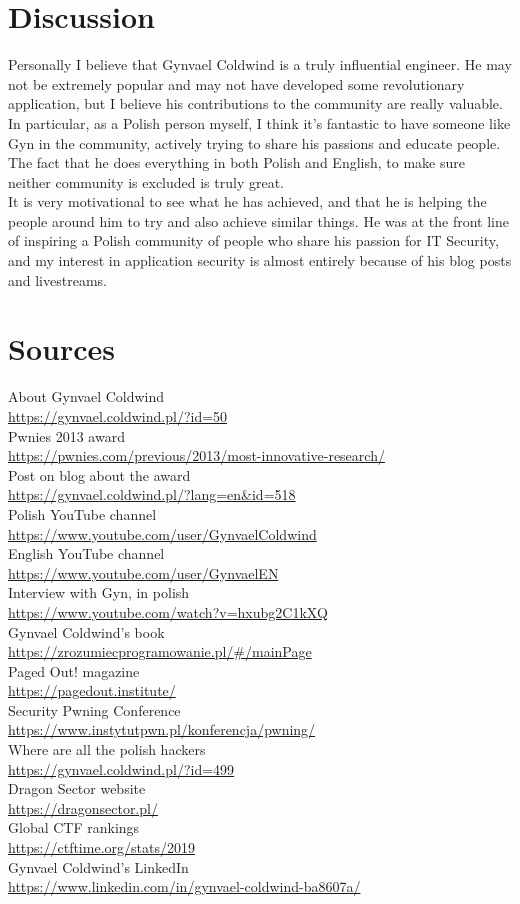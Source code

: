 \documentclass[11pt]{article}
\begin{document}
\section{Discussion}
Personally I believe that Gynvael Coldwind is a truly influential engineer. He may not be extremely popular and may not have developed some revolutionary application, but I believe his contributions to the community are really valuable. In particular, as a Polish person myself, I think it's fantastic to have someone like Gyn in the community, actively trying to share his passions and educate people. The fact that he does everything in both Polish and English, to make sure neither community is excluded is truly great.\\

It is very motivational to see what he has achieved, and that he is helping the people around him to try and also achieve similar things. He was at the front line of inspiring a Polish community of people who share his passion for IT Security, and my interest in application security is almost entirely because of his blog posts and livestreams.


\section{Sources}
About Gynvael Coldwind\\
\url{https://gynvael.coldwind.pl/?id=50}\\
Pwnies 2013 award\\
\url{https://pwnies.com/previous/2013/most-innovative-research/}\\
Post on blog about the award\\
\url{https://gynvael.coldwind.pl/?lang=en&id=518}\\
Polish YouTube channel\\
\url{https://www.youtube.com/user/GynvaelColdwind}\\
English YouTube channel\\
\url{https://www.youtube.com/user/GynvaelEN}\\
Interview with Gyn, in polish\\
\url{https://www.youtube.com/watch?v=hxubg2C1kXQ}\\
Gynvael Coldwind's book\\
\url{https://zrozumiecprogramowanie.pl/#/mainPage}\\
Paged Out! magazine\\
\url{https://pagedout.institute/}\\
Security Pwning Conference\\
\url{https://www.instytutpwn.pl/konferencja/pwning/}\\
Where are all the polish hackers\\
\url{https://gynvael.coldwind.pl/?id=499}\\
Dragon Sector website\\
\url{https://dragonsector.pl/}\\
Global CTF rankings\\
\url{https://ctftime.org/stats/2019}\\
Gynvael Coldwind's LinkedIn\\
\url{https://www.linkedin.com/in/gynvael-coldwind-ba8607a/}

%

 
\end{document}

